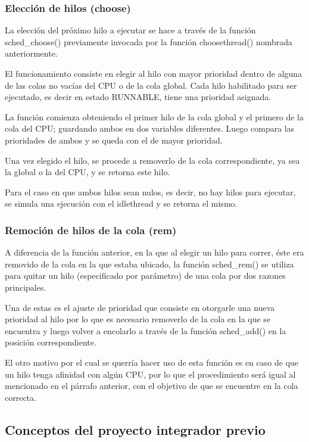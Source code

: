 \subsubsection{Elección de hilos (choose)}
La elección del próximo hilo a ejecutar se hace a través de la función sched\_choose() previamente invocada por la función choosethread() nombrada anteriormente.

El funcionamiento consiste en elegir al hilo con mayor prioridad dentro de alguna de las colas no vacías del CPU o de la cola global. Cada hilo habilitado para ser ejecutado, es decir en estado RUNNABLE, tiene una prioridad asignada.

La función comienza obteniendo el primer hilo de la cola global y el primero de la cola del CPU; guardando ambos en dos variables diferentes. Luego compara las prioridades de ambos y se queda con el de mayor prioridad.

Una vez elegido el hilo, se procede a removerlo de la cola correspondiente, ya sea la global o la del CPU, y se retorna este hilo.

Para el caso en que ambos hilos sean nulos, es decir, no hay hilos para ejecutar, se simula una ejecución con el idlethread y se retorna el mismo.

\subsubsection{Remoción de hilos de la cola (rem)}
A diferencia de la función anterior, en la que al elegir un hilo para correr, éste era removido de la cola en la que estaba ubicado, la función sched\_rem() se utiliza para quitar un hilo (especificado por parámetro) de una cola por dos razones principales.\par

Una de estas es el ajuste de prioridad que consiste en otorgarle una nueva prioridad al hilo por lo que es necesario removerlo de la cola en la que se encuentra y luego volver a encolarlo a través de la función sched\_add() en la posición correspondiente.\par

El otro motivo por el cual se querría hacer uso de esta función es en caso de que un hilo tenga afinidad con algún CPU, por lo que el procedimiento será igual al mencionado en el párrafo anterior, con el objetivo de que se encuentre en la cola correcta.\par

\subsection{Conceptos del proyecto integrador previo}

